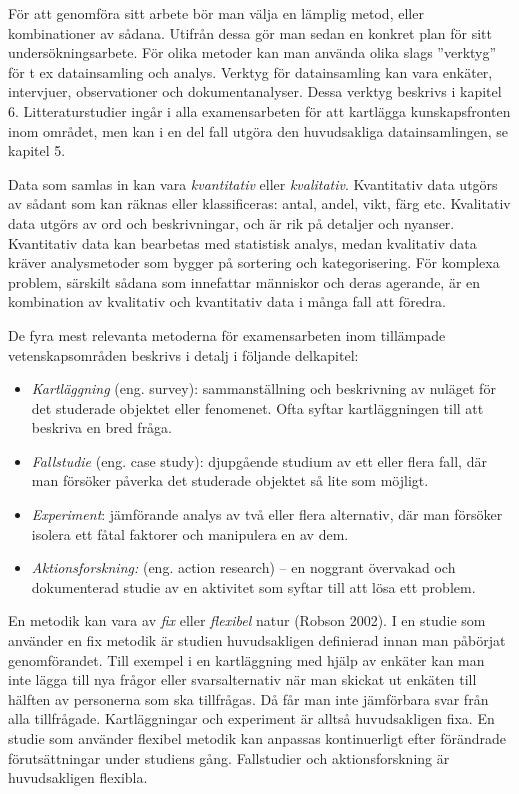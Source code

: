 För att genomföra sitt arbete bör man välja en lämplig metod, eller
kombinationer av sådana. Utifrån dessa gör man sedan en konkret plan för
sitt undersökningsarbete. För olika metoder kan man använda olika slags
''verktyg'' för t ex datainsamling och analys. Verktyg för datainsamling
kan vara enkäter, intervjuer, observationer och dokumentanalyser. Dessa
verktyg beskrivs i kapitel 6. Litteraturstudier ingår i alla
examensarbeten för att kartlägga kunskapsfronten inom området, men kan i
en del fall utgöra den huvudsakliga datainsamlingen, se kapitel 5.

Data som samlas in kan vara \emph{kvantitativ} eller \emph{kvalitativ}.
Kvantitativ data utgörs av sådant som kan räknas eller klassificeras:
antal, andel, vikt, färg etc. Kvalitativ data utgörs av ord och
beskrivningar, och är rik på detaljer och nyanser. Kvantitativ data kan
bearbetas med statistisk analys, medan kvalitativ data kräver
analysmetoder som bygger på sortering och kategorisering. För komplexa
problem, särskilt sådana som innefattar människor och deras agerande, är
en kombination av kvalitativ och kvantitativ data i många fall att
föredra.

De fyra mest relevanta metoderna för examensarbeten inom tillämpade
vetenskapsområden beskrivs i detalj i följande delkapitel:

\begin{itemize}
\item
  \protect\hypertarget{OLE_LINK2}{}{\protect\hypertarget{OLE_LINK1}{}{}}\emph{Kartläggning}
  (eng. survey): sammanställning och beskrivning av nuläget för det
  studerade objektet eller fenomenet. Ofta syftar kartläggningen till
  att beskriva en bred fråga.
\item
  \emph{Fallstudie} (eng. case study): djupgående studium av ett eller
  flera fall, där man försöker påverka det studerade objektet så lite
  som möjligt.
\item
  \emph{Experiment}: jämförande analys av två eller flera alternativ,
  där man försöker isolera ett fåtal faktorer och manipulera en av dem.
\item
  \emph{Aktionsforskning:} (eng. action research) -- en noggrant
  övervakad och dokumenterad studie av en aktivitet som syftar till att
  lösa ett problem.
\end{itemize}

En metodik kan vara av \emph{fix} eller \emph{flexibel} natur (Robson
2002). I en studie som använder en fix metodik är studien huvudsakligen
definierad innan man påbörjat genomförandet. Till exempel i en
kartläggning med hjälp av enkäter kan man inte lägga till nya frågor
eller svarsalternativ när man skickat ut enkäten till hälften av
personerna som ska tillfrågas. Då får man inte jämförbara svar från alla
tillfrågade. Kartläggningar och experiment är alltså huvudsakligen fixa.
En studie som använder flexibel metodik kan anpassas kontinuerligt efter
förändrade förutsättningar under studiens gång. Fallstudier och
aktionsforskning är huvudsakligen flexibla.

